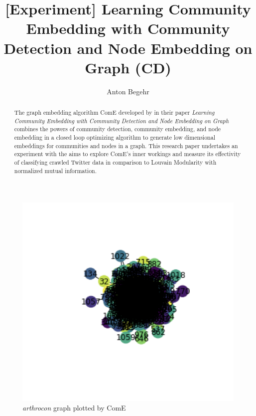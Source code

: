 \documentclass[sigconf]{acmart}
\begin{document}
\title{[Experiment] Learning Community Embedding with Community Detection and Node Embedding on Graph (CD)}

\author{Anton Begehr}


\begin{abstract}
  The graph embedding algorithm ComE developed by \citeauthor{Cav17} in their \citeyear{Cav17} paper \textit{Learning Community Embedding with Community Detection and Node Embedding on Graph} combines the powers of community detection, community embedding, and node embedding in a closed loop optimizing algorithm to generate low dimensional embeddings for communities and nodes in a graph. This research paper undertakes an experiment with the aims to explore ComE's inner workings and measure its effectivity of classifying crawled Twitter data in comparison to Louvain Modularity with normalized mutual information.
\end{abstract}


\maketitle

\begin{figure}
    \includegraphics[width=\linewidth]{graphics/graph_ComE.png}
    \caption{\textit{arthrocon} graph plotted by ComE}
    \label{graph_ComE}
\end{figure} 
\end{document}
